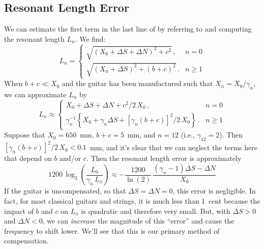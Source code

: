  \subsection{Resonant Length Error}
We can estimate the first term in the last line of  by referring to  and computing the resonant length $L_n$. We find:
 \begin{equation}
L_n = \begin{cases}
\sqrt{\left(X_0 + \Delta S + \Delta N\right)^2 + c^2}\, , & n =  0 \\
\sqrt{\left(X_n + \Delta S\right)^2 + (b + c)^2}\, . & n \ge 1
 \end{cases}
 \end{equation}
When $b + c \ll X_0$ and the guitar has been manufactured such that $X_n = X_0 / \gamma_n$, we can approximate $L_n$ by
 \begin{equation} \label{eqn:l_n_approx}
L_n \approx \begin{cases}
X_0 + \Delta S + \Delta N + c^2/2\, X_0\, , & n =  0 \\
\gamma_n^{-1} \left\{X_0 + \gamma_n \Delta S + \left[\gamma_n (b + c)\right]^2/2\, X_0\right\}\, . & n \ge 1
 \end{cases}
 \end{equation}
 Suppose that $X_0 = 650$~mm, $b + c = 5$~mm, and $n = 12$ (i.e., $\gamma_{12} = 2$). Then $\left[\gamma_n (b + c)\right]^2/2\, X_0 < 0.1$~mm, and it's clear that we can neglect the terms here that depend on $b$ and/or $c$. Then the resonant length error is approximately
  \begin{equation}
  1200\, \log_2 \left( \frac{L_0}{\gamma_n\, L_n} \right) \approx -\frac{1200}{\ln(2)}\, \frac{\left(\gamma_n - 1\right) \Delta S - \Delta N}{X_0}
  \end{equation}
If the guitar is uncompensated, so that $\Delta S = \Delta N = 0$, this error is negligible. In fact, for most classical guitars and strings, it is much less than 1~cent because the impact of $b$ and $c$ on $L_n$ is quadratic and therefore very small. But, with $\Delta S > 0$ and $\Delta N < 0$, we can \emph{increase} the magnitude of this ``error'' and cause the frequency to shift lower. We'll see that this is our primary method of compensation. 

